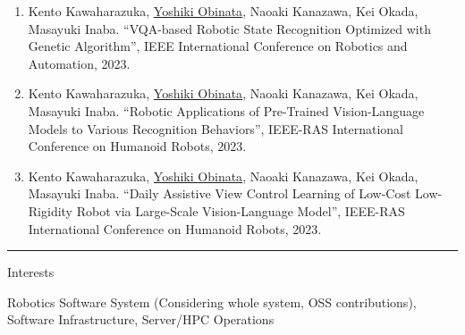 \documentclass[a4paper,10pt]{article}
\newlength{\cvcolumngapwidth}
\newlength{\cvleftcolumnwidth}
\newlength{\cvrightcolumnwidth}
\newcommand{\cvsectionstyle}[1]{{\normalsize\cvsectionfont\textcolor{cvsectioncolor}{#1}}}
\newcommand{\cvheadingstyle}[1]{{\normalsize\cvheadingfont\textcolor{cvheadingcolor}{#1}}}
\newlength{\cvafteritemskipamount}
\newlength{\cvaftersectionskipamount}
\newlength{\cvbetweensectionandheadingextraskipamount}
\newlength{\cvparskip}
\newcommand{\cvsection}[1]{
    \begin{minipage}[t]{\cvleftcolumnwidth}
        \raggedleft\cvsectionstyle{#1}
    \end{minipage}%
    \hspace{\cvcolumngapwidth}%
    \begin{minipage}[t]{\cvrightcolumnwidth}
        \textcolor{cvrulecolor}{\rule{\cvrightcolumnwidth}{0.3mm}}
    \end{minipage}

    \vspace{\cvaftersectionskipamount}
}
\newcommand{\cvitem}[2]{
    \begin{minipage}[t]{\cvleftcolumnwidth}
        \raggedleft #1
    \end{minipage}%
    \hspace{\cvcolumngapwidth}%
    \begin{minipage}[t]{\cvrightcolumnwidth}
        \setlength{\parskip}{\cvparskip} #2
    \end{minipage}

    \vspace{\cvafteritemskipamount}
}
\begin{document}
{\begin{enumerate}
  \item Kento Kawaharazuka, \underline{Yoshiki Obinata}, Naoaki Kanazawa, Kei Okada, Masayuki Inaba. ``VQA-based Robotic State Recognition Optimized with Genetic Algorithm'', IEEE International Conference on Robotics and Automation, 2023.
  \item Kento Kawaharazuka, \underline{Yoshiki Obinata}, Naoaki Kanazawa, Kei Okada, Masayuki Inaba. ``Robotic Applications of Pre-Trained Vision-Language Models to Various Recognition Behaviors'', IEEE-RAS International Conference on Humanoid Robots, 2023.
  \item Kento Kawaharazuka, \underline{Yoshiki Obinata}, Naoaki Kanazawa, Kei Okada, Masayuki Inaba. ``Daily Assistive View Control Learning of Low-Cost Low-Rigidity Robot via Large-Scale Vision-Language Model'', IEEE-RAS International Conference on Humanoid Robots, 2023.
  \end{enumerate}
}


\cvsection{ADDITIONAL INFORMATION}

\vspace{\cvbetweensectionandheadingextraskipamount}


\cvitem{
    \cvheadingstyle{Interests}
}{
    Robotics Software System (Considering whole system, OSS contributions), Software Infrastructure, Server/HPC Operations
}
\end{document}
